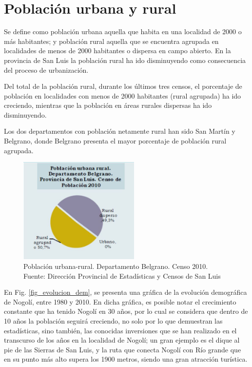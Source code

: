 \documentclass[12pt,a4paper]{book}
\begin{document}
\section{Población urbana y rural}

Se define como población urbana aquella que habita en una localidad de 2000 o más habitantes; y población rural aquella que se encuentra agrupada en localidades de menos de 2000 habitantes o dispersa en campo abierto. En la provincia de San Luis la población rural ha ido disminuyendo como consecuencia del proceso de urbanización.

Del total de la población rural, durante los últimos tres censos, el porcentaje de población en localidades con menos de 2000 habitantes (rural agrupada) ha ido creciendo, mientras que la población en áreas rurales dispersas ha ido disminuyendo.

Los dos departamentos con población netamente rural han sido San Martín y Belgrano, donde Belgrano presenta el mayor porcentaje de población rural agrupada.

\begin{figure} [H]
\centering
\includegraphics[width= 6cm]{../figuras/4_1_Fig1.jpg}
\caption{Población urbana-rural. Departamento Belgrano. Censo 2010. Fuente: Dirección Provincial de Estadísticas y Censos de San Luis}
\label{fig_pob_urbRur_dem}
\end{figure}	


En Fig. \ref{fig_evolucion_dem}, se presenta una gráfica de la evolución demográfica de Nogolí, entre 1980 y 2010. En dicha gráfica, es posible notar el crecimiento constante que ha tenido Nogolí en 30 años, por lo cual se considera que dentro de 10 años la población seguirá creciendo, no solo por lo que demuestran las estadísticas, sino también, las conocidas inversiones que se han realizado en el transcurso de los años en la localidad de Nogolí; un gran ejemplo es el dique al pie de las Sierras de San Luis, y la ruta que conecta Nogolí con Río grande que en su punto más alto supera los 1900 metros, siendo una gran atracción turística.
\end{document}
